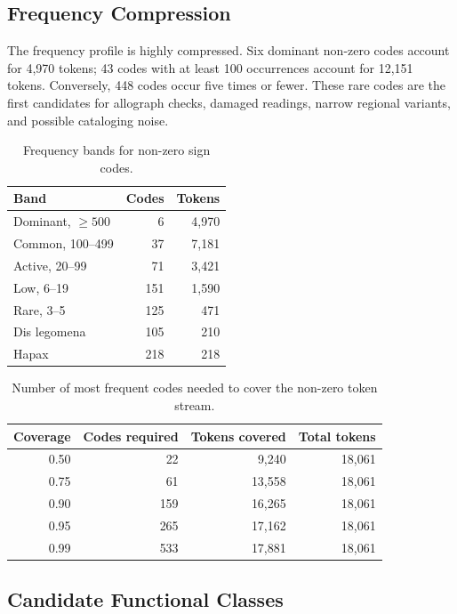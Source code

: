 \subsection{Frequency Compression}

The frequency profile is highly compressed. Six dominant non-zero codes account for 4,970 tokens; 43 codes with at least 100 occurrences account for 12,151 tokens. Conversely, 448 codes occur five times or fewer. These rare codes are the first candidates for allograph checks, damaged readings, narrow regional variants, and possible cataloging noise.

\begin{table}[htbp]
\centering
\begin{tabular}{lrr}
\toprule
\textbf{Band} & \textbf{Codes} & \textbf{Tokens} \\
\midrule
Dominant, $\geq 500$ & 6 & 4,970 \\
Common, 100--499 & 37 & 7,181 \\
Active, 20--99 & 71 & 3,421 \\
Low, 6--19 & 151 & 1,590 \\
Rare, 3--5 & 125 & 471 \\
Dis legomena & 105 & 210 \\
Hapax & 218 & 218 \\
\bottomrule
\end{tabular}
\caption{Frequency bands for non-zero sign codes.}
\label{tab:frequency-bands}
\end{table}

\begin{table}[htbp]
\centering
\begin{tabular}{rrrr}
\toprule
\textbf{Coverage} & \textbf{Codes required} & \textbf{Tokens covered} & \textbf{Total tokens} \\
\midrule
0.50 & 22 & 9,240 & 18,061 \\
0.75 & 61 & 13,558 & 18,061 \\
0.90 & 159 & 16,265 & 18,061 \\
0.95 & 265 & 17,162 & 18,061 \\
0.99 & 533 & 17,881 & 18,061 \\
\bottomrule
\end{tabular}
\caption{Number of most frequent codes needed to cover the non-zero token stream.}
\label{tab:coverage-thresholds}
\end{table}

\subsection{Candidate Functional Classes}

